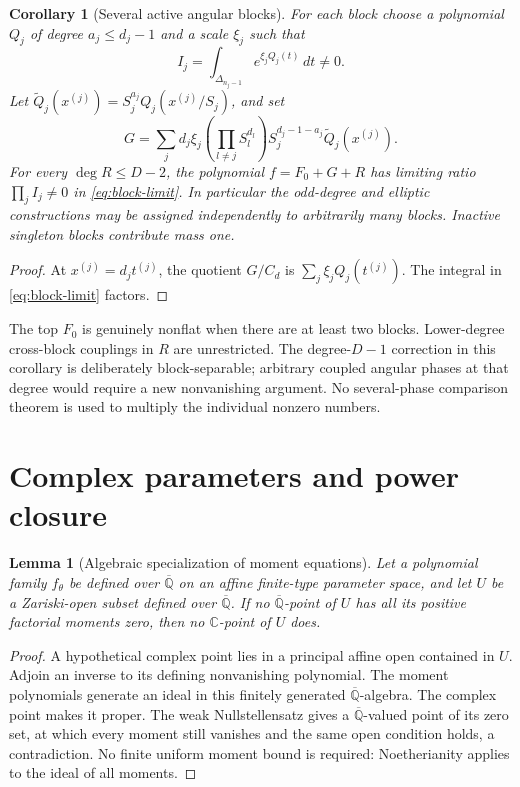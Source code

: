 \documentclass[11pt]{article}
\numberwithin{equation}{section}
\newtheorem{lemma}[lemma]{Lemma}
\newtheorem{corollary}[corollary]{Corollary}
\theoremstyle{definition}
\theoremstyle{remark}
\newcommand{\C}{\mathbb C}
\newcommand{\Qbar}{\overline{\mathbb Q}}
\begin{document}
\begin{corollary}[Several active angular blocks]\label{cor:block-family}
For each block choose a polynomial $Q_j$ of degree $a_j\le d_j-1$ and a
scale $\xi_j$ such that
\[
 I_j=\int_{\Delta_{n_j-1}}e^{\xi_jQ_j(t)}\,dt\ne0.
\]
Let $\widetilde Q_j(x^{(j)})=S_j^{a_j}Q_j(x^{(j)}/S_j)$, and set
\[
 G=\sum_j d_j\xi_j\left(\prod_{l\ne j}S_l^{d_l}\right)
 S_j^{d_j-1-a_j}\widetilde Q_j(x^{(j)}).
\]
For every $\deg R\le D-2$, the polynomial $f=F_0+G+R$ has limiting ratio
$\prod_jI_j\ne0$ in \eqref{eq:block-limit}. In particular the odd-degree and
elliptic constructions may be assigned independently to arbitrarily many
blocks. Inactive singleton blocks contribute mass one.
\end{corollary}
\begin{proof}
At $x^{(j)}=d_jt^{(j)}$, the quotient $G/C_d$ is
$\sum_j\xi_jQ_j(t^{(j)})$. The integral in \eqref{eq:block-limit} factors.
\end{proof}

The top $F_0$ is genuinely nonflat when there are at least two blocks.
Lower-degree cross-block couplings in $R$ are unrestricted. The degree-$D-1$
correction in this corollary is deliberately block-separable; arbitrary
coupled angular phases at that degree would require a new nonvanishing
argument. No several-phase comparison theorem is used to multiply the
individual nonzero numbers.

\section{Complex parameters and power closure}\label{sec:complex}
\begin{lemma}[Algebraic specialization of moment equations]\label{lem:specialization}
Let a polynomial family $f_\theta$ be defined over $\Qbar$ on an affine
finite-type parameter space, and let $U$ be a Zariski-open subset defined
over $\Qbar$. If no $\Qbar$-point of $U$ has all its positive factorial moments zero,
then no $\C$-point of $U$ does.
\end{lemma}
\begin{proof}
A hypothetical complex point lies in a principal affine open contained in
$U$. Adjoin an inverse to its defining nonvanishing polynomial. The moment
polynomials generate an ideal in this finitely generated $\Qbar$-algebra.
The complex point makes it proper. The weak Nullstellensatz gives a
$\Qbar$-valued point of its zero set, at which every moment still vanishes and
the same open condition holds, a contradiction. No finite uniform moment
bound is required: Noetherianity applies to the ideal of all moments.
\end{proof}
\end{document}

